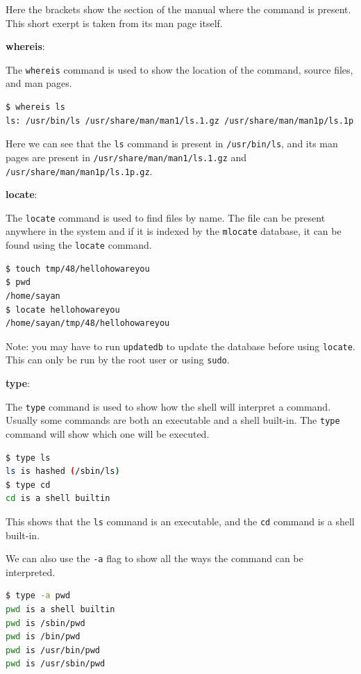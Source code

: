 Here the brackets show the section of the manual where the command is present.
This short exerpt is taken from its man page itself.

\textbf{whereis}:

The \texttt{whereis} command is used to show the location of the command, source
files, and man pages.

\begin{lstlisting}[language=bash]
$ whereis ls
ls: /usr/bin/ls /usr/share/man/man1/ls.1.gz /usr/share/man/man1p/ls.1p.gz
\end{lstlisting}

Here we can see that the \texttt{ls} command is present in \texttt{/usr/bin/ls},
and its man pages are present in \texttt{/usr/share/man/man1/ls.1.gz} and
\texttt{/usr/share/man/man1p/ls.1p.gz}.

\textbf{locate}:

The \texttt{locate} command is used to find files by name.
The file can be present anywhere in the system and if it is
indexed by the \texttt{mlocate} database, it can be found using the \texttt{locate} command.

\begin{lstlisting}[language=bash]
$ touch tmp/48/hellohowareyou
$ pwd
/home/sayan
$ locate hellohowareyou
/home/sayan/tmp/48/hellohowareyou
\end{lstlisting}

Note: you may have to run \texttt{updatedb} to update the database before using \texttt{locate}.
This can only be run by the root user or using \texttt{sudo}.

\textbf{type}:

The \texttt{type} command is used to show how the shell will interpret a command.
Usually some commands are both an executable and a shell built-in.
The \texttt{type} command will show which one will be executed.

\begin{lstlisting}[language=bash]
$ type ls
ls is hashed (/sbin/ls)
$ type cd
cd is a shell builtin
\end{lstlisting}

This shows that the \texttt{ls} command is an executable, and the \texttt{cd} command is a shell built-in.

We can also use the \texttt{-a} flag to show all the ways the command can be interpreted.

\begin{lstlisting}[language=bash]
$ type -a pwd
pwd is a shell builtin
pwd is /sbin/pwd
pwd is /bin/pwd
pwd is /usr/bin/pwd
pwd is /usr/sbin/pwd
\end{lstlisting}

